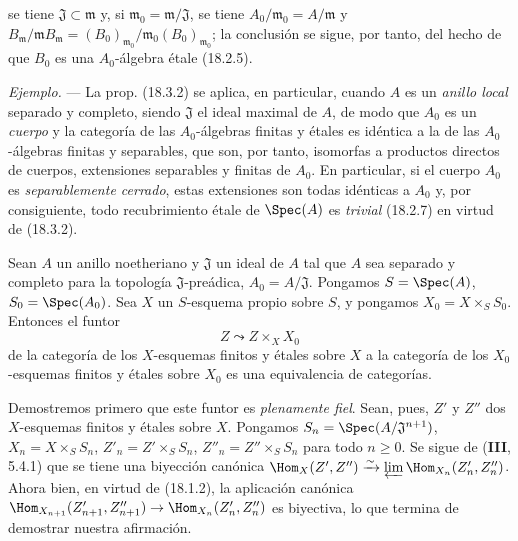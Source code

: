 
se tiene $\mathfrak J\subset\mathfrak m$ y, si $\mathfrak m_0=\mathfrak m/\mathfrak J$, se tiene $A_0/\mathfrak m_0=A/\mathfrak m$ y $B_{\mathfrak m}/\mathfrak mB_{\mathfrak m}=(B_0)_{\mathfrak m_0}/\mathfrak m_0(B_0)_{\mathfrak m_0}$; la conclusión se sigue, por tanto, del hecho de que $B_0$ es una $A_0$-álgebra étale (18.2.5).

\begin{env}[18.3.3]
\label{IV.18.3.3}
\emph{Ejemplo.} --- La prop. (18.3.2) se aplica, en particular, cuando $A$ es un \emph{anillo local} separado y completo, siendo $\mathfrak J$ el ideal maximal de $A$, de modo que $A_0$ es un \emph{cuerpo} y la categoría de las $A_0$-álgebras finitas y étales es idéntica a la de las $A_0$-álgebras finitas y separables, que son, por tanto, isomorfas a productos directos de cuerpos, extensiones separables y finitas de $A_0$. En particular, si el cuerpo $A_0$ es \emph{separablemente cerrado}, estas extensiones son todas idénticas a $A_0$ y, por consiguiente, todo recubrimiento étale de $\Spec(A)$ es \emph{trivial} (18.2.7) en virtud de (18.3.2).
\end{env}

\begin{theorem}[18.3.4]
\label{IV.18.3.4}
Sean $A$ un anillo noetheriano y $\mathfrak J$ un ideal de $A$ tal que $A$ sea separado y completo para la topología $\mathfrak J$-preádica, $A_0=A/\mathfrak J$. Pongamos $S=\Spec(A)$, $S_0=\Spec(A_0)$. Sea $X$ un $S$-esquema propio sobre $S$, y pongamos $X_0=X\times_S S_0$. Entonces el funtor
\[
  Z\leadsto Z\times_X X_0
\]
de la categoría de los $X$-esquemas finitos y étales sobre $X$ a la categoría de los $X_0$-esquemas finitos y étales sobre $X_0$ es una equivalencia de categorías.
\end{theorem}

Demostremos primero que este funtor es \emph{plenamente fiel}. Sean, pues, $Z'$ y $Z''$ dos $X$-esquemas finitos y étales sobre $X$. Pongamos $S_n=\Spec(A/\mathfrak J^{n+1})$, $X_n=X\times_S S_n$, $Z'_n=Z'\times_S S_n$, $Z''_n=Z''\times_S S_n$ para todo $n\geq 0$. Se sigue de (\textbf{III}, 5.4.1) que se tiene una biyección canónica $\Hom_X(Z',Z'')\xrightarrow{\sim}\varprojlim\Hom_{X_n}(Z'_n,Z''_n)$. Ahora bien, en virtud de (18.1.2), la aplicación canónica $\Hom_{X_{n+1}}(Z'_{n+1},Z''_{n+1})\to\Hom_{X_n}(Z'_n,Z''_n)$ es biyectiva, lo que termina de demostrar nuestra afirmación.

